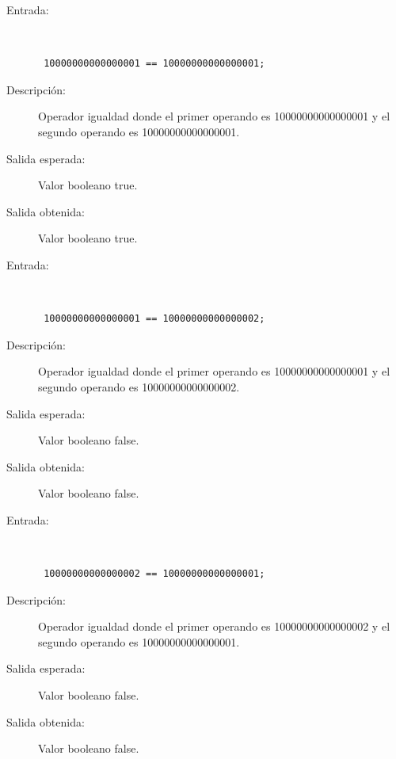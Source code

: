 \begin{framed}
	\begin{description}
		\item [Entrada:] \hfill \\
\begin{lstlisting}
 10000000000000001 == 10000000000000001;
\end{lstlisting}
		\item [Descripción:] Operador igualdad donde el primer operando es 10000000000000001 y el segundo operando es  10000000000000001.
		\item [Salida esperada:] Valor booleano true.
		\item [Salida obtenida:] Valor booleano true.
	\end{description}
\end{framed}

\begin{framed}
	\begin{description}
		\item [Entrada:] \hfill \\
\begin{lstlisting}
 10000000000000001 == 10000000000000002;
\end{lstlisting}
		\item [Descripción:] Operador igualdad donde el primer operando es 10000000000000001 y el segundo operando es  10000000000000002.
		\item [Salida esperada:] Valor booleano false.
		\item [Salida obtenida:] Valor booleano false.
	\end{description}
\end{framed}

\begin{framed}
	\begin{description}
		\item [Entrada:] \hfill \\
\begin{lstlisting}
 10000000000000002 == 10000000000000001;
\end{lstlisting}
		\item [Descripción:] Operador igualdad donde el primer operando es 10000000000000002 y el segundo operando es  10000000000000001.
		\item [Salida esperada:] Valor booleano false.
		\item [Salida obtenida:] Valor booleano false.
	\end{description}
\end{framed}

